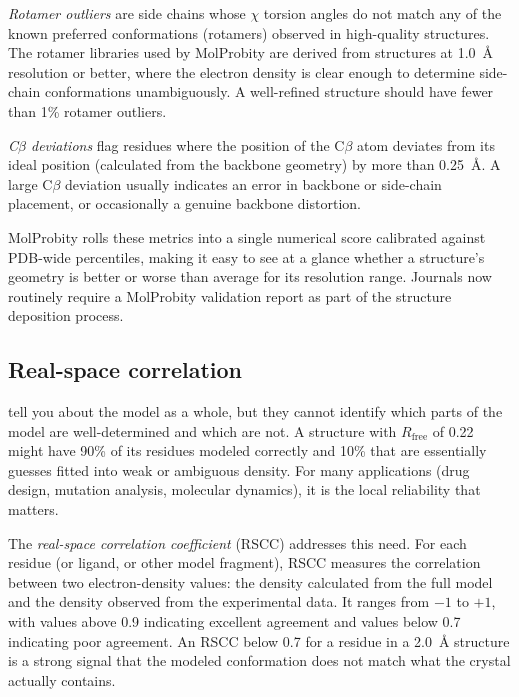 \emph{Rotamer outliers} are side chains whose $\chi$ torsion angles
do not match any of the known preferred conformations (rotamers)
observed in high-quality structures. The rotamer libraries used by
MolProbity are derived from structures at 1.0~{\AA} resolution or
better, where the electron density is clear enough to determine
side-chain conformations unambiguously. A well-refined structure
should have fewer than 1\% rotamer outliers.

\emph{C$\beta$ deviations} flag residues where the position of the
C$\beta$ atom deviates from its ideal position (calculated from the
backbone geometry) by more than 0.25~{\AA}. A large C$\beta$ deviation
usually indicates an error in backbone or side-chain placement, or
occasionally a genuine backbone distortion.

MolProbity rolls these metrics into a single numerical score calibrated
against PDB-wide percentiles, making it easy to see at a glance whether
a structure's geometry is better or worse than average for its resolution
range. Journals now routinely require a MolProbity validation report as
part of the structure deposition process.

\subsection{Real-space correlation}
\label{sec:rscc}

 tell you about the
model as a whole, but they cannot identify which parts of the model are
well-determined and which are not. A structure with $R_{\mathrm{free}}$
of 0.22 might have 90\% of its residues modeled correctly and 10\%
that are essentially guesses fitted into weak or ambiguous density. For
many applications (drug design, mutation analysis, molecular
dynamics), it is the local reliability that matters.

The \emph{real-space correlation coefficient} (RSCC) addresses this
need. For each residue (or ligand, or other model fragment), RSCC
measures the correlation between two electron-density values: the
density calculated from the full model and the density observed from
the experimental data.
It ranges from $-1$ to $+1$, with values above 0.9 indicating excellent
agreement and values below 0.7 indicating poor agreement. An RSCC below
0.7 for a residue in a 2.0~{\AA} structure is a strong signal that the
modeled conformation does not match what the crystal actually contains.


